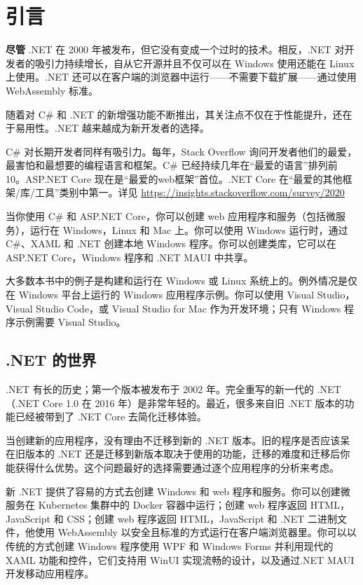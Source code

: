 \chapter*{引言}
\textbf{尽管} .NET 在 2000 年被发布，但它没有变成一个过时的技术。相反，.NET 对开发者的吸引力持续增长，自从它开源并且不仅可以在 Windows 使用还能在 Linux 上使用。.NET 还可以在客户端的浏览器中运行——不需要下载扩展——通过使用 WebAssembly 标准。

随着对 C\# 和 .NET 的新增强功能不断推出，其关注点不仅在于性能提升，还在于易用性。.NET 越来越成为新开发者的选择。

C\# 对长期开发者同样有吸引力。每年，Stack Overflow 询问开发者他们的最爱，最害怕和最想要的编程语言和框架。C\# 已经持续几年在“最爱的语言”排列前 10。ASP.NET Core 现在是“最爱的web框架”首位。.NET Core 在“最爱的其他框架/库/工具”类别中第一。详见 \url{https://insights.stackoverflow.com/survey/2020}

当你使用 C\# 和 ASP.NET Core，你可以创建 web 应用程序和服务（包括微服务），运行在 Windows，Linux 和 Mac 上。你可以使用 Windows 运行时，通过 C\#、XAML 和 .NET 创建本地 Windows 程序。你可以创建类库，它可以在 ASP.NET Core，Windows 程序和 .NET MAUI 中共享。

大多数本书中的例子是构建和运行在 Windows 或 Linux 系统上的。例外情况是仅在 Windows 平台上运行的 Windows 应用程序示例。你可以使用 Visual Studio，Visual Studio Code，或 Visual Studio for Mac 作为开发环境；只有 Windows 程序示例需要 Visual Studio。

\section*{.NET 的世界}
.NET 有长的历史；第一个版本被发布于 2002 年。完全重写的新一代的 .NET（.NET Core 1.0 在 2016 年）是非常年轻的。最近，很多来自旧 .NET 版本的功能已经被带到了 .NET Core 去简化迁移体验。

当创建新的应用程序，没有理由不迁移到新的 .NET 版本。旧的程序是否应该呆在旧版本的 .NET 还是迁移到新版本取决于使用的功能，迁移的难度和迁移后你能获得什么优势。这个问题最好的选择需要通过逐个应用程序的分析来考虑。

新 .NET 提供了容易的方式去创建 Windows 和 web 程序和服务。你可以创建微服务在 Kubernetes 集群中的 Docker 容器中运行；创建 web 程序返回 HTML，JavaScript 和 CSS；创建 web 程序返回 HTML，JavaScript 和 .NET 二进制文件，他使用 WebAssembly 以安全且标准的方式运行在客户端浏览器里。你可以以传统的方式创建 Windows 程序使用 WPF 和 Windows Forms 并利用现代的 XAML 功能和控件，它们支持用 WinUI 实现流畅的设计，以及通过.NET MAUI 开发移动应用程序。

